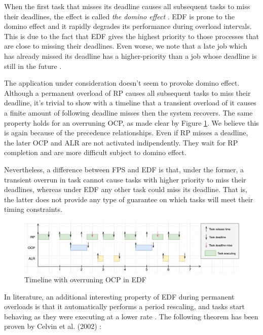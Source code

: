 \documentclass{article}
\begin{document}
When the first task that misses its deadline causes all subsequent tasks to miss their deadlines, the effect is called \textit{the domino effect} \cite{value-deadline}. EDF is prone to the domino effect and it rapidly degrades its performance during overload intervals. This is due to the fact that EDF gives the highest priority to those processes that are close to missing their deadlines. Even worse, we note that a late job which has already missed its deadline has a higher-priority than a job whose deadline is still in the future \cite{fps-vs-edf}.

The application under consideration doesn't seem to provoke domino effect. Although a permanent overload of RP causes all subsequent tasks to miss their deadline, it's trivial to show with a timeline that a transient overload of it causes a finite amount of following deadline misses then the system recovers. The same property holds for an overruning OCP, as made clear by Figure \ref{timeline-overload-edf-ocp}. We believe this is again because of the precedence relationships. Even if RP misses a deadline, the later OCP and ALR are not activated indipendently. They wait for RP completion and are more difficult subject to domino effect.

Nevertheless, a difference between FPS and EDF is that, under the former, a transient overrun in task cannot cause tasks with higher priority to miss their deadlines, whereas under EDF any other task could miss its deadline. That is, the latter does not provide any type of guarantee on which tasks will meet their timing constraints.

\begin{figure}[!htbp]
\centering
\includegraphics[width=6.5in]{images/timeline-overload-edf-ocp}
\caption{Timeline with overruning OCP in EDF}
\label{timeline-overload-edf-ocp}
\end{figure}

In literature, an additional interesting property of EDF during permanent overloads is that it automatically performs a period rescaling, and tasks start behaving as they were executing at a lower rate \cite{buttazzo-rm-edf}. The following theorem has been proven by Celvin et al. (2002) \cite{cervin}:
\end{document}
